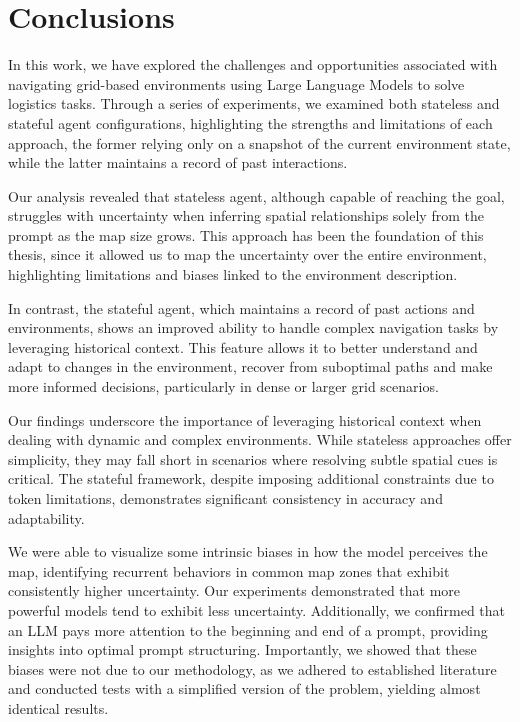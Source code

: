 \chapter{Conclusions}
\label{cha:conclusions}

In this work, we have explored the challenges and opportunities associated with navigating
grid-based environments using Large Language Models to solve logistics tasks.
Through a series of experiments, we examined both stateless and stateful agent configurations,
highlighting the strengths and limitations of each approach, the former relying only
on a snapshot of the current environment state, while the latter maintains a
record of past interactions.

Our analysis revealed that stateless agent, although capable of reaching the goal,
struggles with uncertainty when inferring spatial relationships solely from the
prompt as the map size grows. This approach has been the foundation of this thesis,
since it allowed us to map the uncertainty over the entire environment, highlighting
limitations and biases linked to the environment description.

In contrast, the stateful agent, which maintains a record of past actions and environments,
shows an improved ability to handle complex navigation tasks by leveraging
historical context. This feature allows it to better understand and adapt to changes
in the environment, recover from suboptimal paths and make more informed
decisions, particularly in dense or larger grid scenarios.

Our findings underscore the importance of leveraging historical context when dealing
with dynamic and complex environments. While stateless approaches offer
simplicity, they may fall short in scenarios where resolving subtle spatial cues
is critical. The stateful framework, despite imposing additional constraints due
to token limitations, demonstrates significant consistency in accuracy and
adaptability.

We were able to visualize some intrinsic biases in how the model perceives the
map, identifying recurrent behaviors in common map zones that exhibit consistently
higher uncertainty. Our experiments demonstrated that more powerful models tend
to exhibit less uncertainty. Additionally, we confirmed that an LLM pays more
attention to the beginning and end of a prompt, providing insights into optimal prompt
structuring. Importantly, we showed that these biases were not due to our methodology,
as we adhered to established literature and conducted tests with a simplified
version of the problem, yielding almost identical results.

